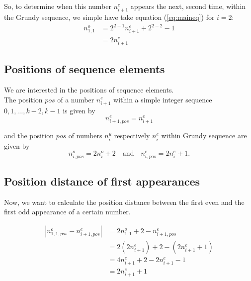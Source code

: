 \documentclass[12pt]{../document-templates/papers/one-column-mydashie/mydashie}
\newtheorem*{theorem A}{Theorem A}
\newtheorem*{theorem B}{N\"olker's Theorem}
\theoremstyle{remark}
\theoremstyle{remark}
\begin{document}
So, to determine when this number $n_{i+1}^{e}$ appears the next, second time, within the Grundy sequence, we simple have take equation (\ref{eq:maineq}) for $i=2$:
\begin{equation}
    \begin{split}
        n_{1,1}^{o} &= 2^{2-1}n_{i+1}^{e} + 2^{2-2} - 1\\
            &= 2n_{i+1}^{e}
    \end{split}
\label{eq:odd_firstappearance}
\end{equation}
\subsection{Positions of sequence elements}
\label{ss:postitionofsequenceelements}
We are interested in the positions of sequence elements.\\

The position $pos$ of a number $n_{i+1}^{e}$ within a simple integer sequence $0,1, \dots, k-2, k-1$ is given by
\begin{equation}
    n_{i+1,pos}^{e} = n_{i+1}^{e}
\label{eq:number_pos}
\end{equation}

and the position $pos$ of numbers $n_{i}^{u}$ respectively $n_{i}^{e}$ within Grundy sequence are given by
\begin{equation}
    n_{i,pos}^{o} = 2n_{i}^{o} + 2 \quad \mathrm{and} \quad n_{i,pos}^{e} = 2n_{i}^{e} + 1.
\label{eq:gundy_pos}
\end{equation}
\subsection{Position distance of first appearances}
\label{ss:positiondistanceoffirstappearances}
Now, we want to calculate the position distance between the first even and the first odd appearance of a certain number.

\begin{equation}
    \begin{split}
        |n_{1,1,pos}^{o} - n_{i+1,pos}^{e}| &= 2n_{1,1}^{o} + 2 - n_{i+1,pos}^{e}\\
            &= 2\left(2n_{i+1}^{e}\right) + 2 - \left(2n_{i+1}^{e} + 1\right)\\
            &= 4n_{i+1}^{e} + 2 - 2n_{i+1}^{e} - 1\\
            &= 2n_{i+1}^{e} + 1
    \end{split}
\label{eq:postdistfirstapp}
\end{equation}
\end{document}
